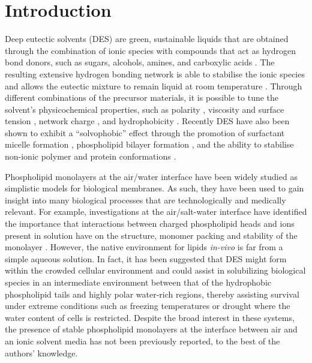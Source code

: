 \documentclass[amsmath,amssymb,twocolumn,superscriptaddress]{revtex4-1}
\begin{document}
\section{Introduction}
%
Deep eutectic solvents (DES) are green, sustainable liquids that are obtained through the combination of ionic species with compounds that act as hydrogen bond donors, such as sugars, alcohols, amines, and carboxylic acids \cite{smith_deep_2014,dai_natural_2013}.
The resulting extensive hydrogen bonding network is able to stabilise the ionic species and allows the eutectic mixture to remain liquid at room temperature \cite{hammond_liquid_2016,hammond_resilience_2017,araujo_inelastic_2017}.
Through different combinations of the precursor materials, it is possible to tune the solvent's physicochemical properties, such as polarity \cite{pandey_how_2014}, viscosity and surface tension \cite{smith_deep_2014}, network charge \cite{zahn_charge_2016}, and hydrophobicity \cite{ribeiro_menthol-based_2015,van_osch_hydrophobic_2015}.
Recently DES have also been shown to exhibit a ``solvophobic'' effect through the promotion of surfactant micelle formation \cite{sanchez-fernandez_micellization_2016,arnold_surfactant_2015,hsieh_micelle_2018,banjare_self-assembly_2018}, phospholipid bilayer formation \cite{bryant_effect_2017,bryant_spontaneous_2016,gutierrez_freeze-drying_2009}, and the ability to stabilise non-ionic polymer \cite{sapir_properties_2016} and protein conformations \cite{sanchez-fernandez_protein_2017}.

Phospholipid monolayers at the air/water interface have been widely studied as simplistic models for biological membranes.
As such, they have been used to gain insight into many biological processes that are technologically and medically relevant.
For example, investigations at the air/salt-water interface have identified the importance that interactions between charged phospholipid heads and ions present in solution have on the structure, monomer packing and stability of the monolayer \cite{mohwald_phospholipid_1990,kewalramani_effects_2010}.
However, the native environment for lipids \emph{in-vivo} is far from a simple aqueous solution.
In fact, it has been suggested \cite{dai_natural_2013,hammond_resilience_2017} that DES might form within the crowded cellular environment and could assist in solubilizing biological species in an intermediate environment between that of the hydrophobic phospholipid tails and highly polar water-rich regions, thereby assisting survival under extreme conditions such as freezing temperatures or drought where the water content of cells is restricted.
Despite the broad interest in these systems, the presence of stable phospholipid monolayers at the interface between air and an ionic solvent media has not been previously reported, to the best of the authors' knowledge.
\end{document}
